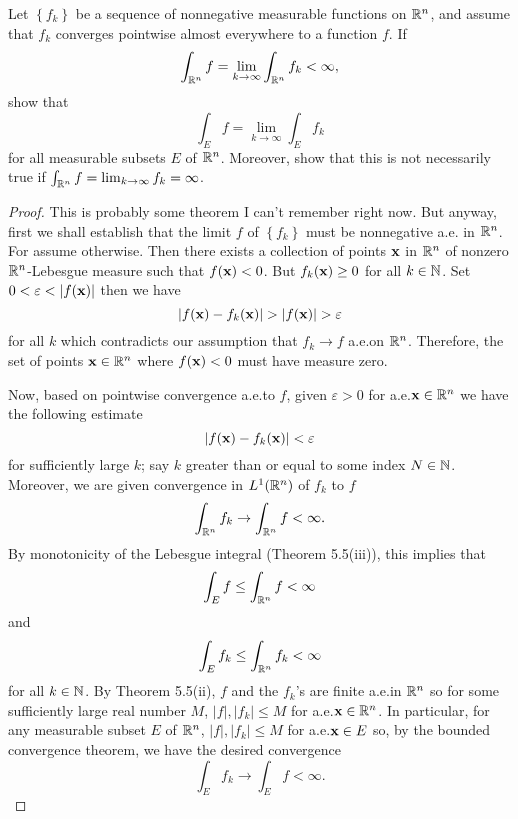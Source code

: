 \begin{problem}
Let $\left\{f_k\right\}$ be a sequence of nonnegative measurable functions
on $\mathbb{R}^n$, and assume that $f_k$ converges pointwise almost everywhere to
a function $f$. If
\[
\int_{\mathbb{R}^n} f=\lim_{k\to\infty}\int_{\mathbb{R}^n} f_k<\infty,
\]
show that
\[
\int_E f=\lim_{k\to\infty}\int_E f_k
\]
for all measurable subsets $E$ of $\mathbb{R}^n$. Moreover, show that this is not
necessarily true if $\int_{\mathbb{R}^n} f=\lim_{k\to\infty} f_k=\infty$.
\end{problem}
\begin{proof}
This is probably some theorem I can't remember right now. But anyway, first
we shall establish that the limit $f$ of $\left\{f_k\right\}$ must be
nonnegative a.e. in $\mathbb{R}^n$. For assume otherwise. Then there exists a
collection of points $\mathbf{x}$ in $\mathbb{R}^n$ of nonzero $\mathbb{R}^n$-Lebesgue
measure such that $f(\mathbf{x})<0$. But $f_k(\mathbf{x})\geq 0$ for all
$k\in\mathbb{N}$. Set $0<\varepsilon<|f(\bfx)|$ then we have
\begin{equation}
\label{eq:estimate-contradiction-1}
|f(\bfx)-f_k(\bfx)|>|f(\bfx)|>\varepsilon
\end{equation}
for all $k$ which contradicts our assumption that $f_k\to f$ a.e.\@ on
$\mathbb{R}^n$. Therefore, the set of points $\mathbf{x}\in\mathbb{R}^n$ where $f(\mathbf{x})<0$
must have measure zero.

Now, based on pointwise convergence a.e.\@ to $f$, given $\varepsilon>0$
for a.e.\@ $\mathbf{x}\in\mathbb{R}^n$ we have the following estimate
\begin{equation}
\label{eq:estimate-2}
|f(\mathbf{x})-f_k(\mathbf{x})|<\varepsilon
\end{equation}
for sufficiently large $k$; say $k$ greater than or equal to some index
$N\in\mathbb{N}$. Moreover, we are given convergence in $L^1(\mathbb{R}^n)$ of $f_k$ to
$f$
\begin{equation}
\label{eq:integral-estimate-1}
\int_{\mathbb{R}^n}f_k\to\int_{\mathbb{R}^n}f<\infty.
\end{equation}
By monotonicity of the Lebesgue integral (Theorem 5.5(iii)), this implies
that
\begin{equation}
\label{eq:estimate-monotonicity-2}
\int_E f\leq\int_{\mathbb{R}^n} f<\infty
\end{equation}
and
\begin{equation}
\label{eq:estimate-monotonicity-k-2}
\int_E f_k\leq\int_{\mathbb{R}^n}f_k<\infty
\end{equation}
for all $k\in\mathbb{N}$. By Theorem 5.5(ii), $f$ and the $f_k$'s are finite
a.e.\@ in $\mathbb{R}^n$ so for some sufficiently large real number $M$,
$|f|,|f_k|\leq M$ for a.e.\@ $\mathbf{x}\in\mathbb{R}^n$. In particular, for any
measurable subset $E$ of $\mathbb{R}^n$, $|f|,|f_k|\leq M$ for a.e.\@ $\mathbf{x}\in E$
so, by the bounded convergence theorem, we have the desired convergence
\begin{equation}
\label{eq:desired-convergence-2}
\int_E f_k\to\int_E f<\infty.
\end{equation}


\end{proof}
